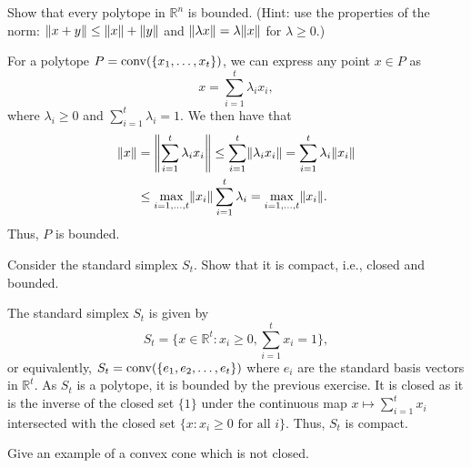 \begin{exercise}
  Show that every polytope in $\mathbb{R}^n$ is bounded.
  (Hint: use the properties of the norm: $\norm{x + y} \leq \norm{x} + \norm{y}$ and $\norm{\lambda x} = \lambda \norm{x}$ for $\lambda \geq 0$.)
\end{exercise}

\begin{solution}
  For a polytope $P = \conv(\{x_1, \ldots, x_t\})$, we can express any point $x \in P$ as
  \begin{equation}
    x = \sum_{i=1}^t \lambda_i x_i,
  \end{equation}
  where $\lambda_i \geq 0$ and $\sum_{i=1}^t \lambda_i = 1$.
  We then have that
  \begin{equation}
    \begin{split}
      \norm{x}
      &= \norm*{\sum_{i=1}^t \lambda_i x_i} \leq \sum_{i=1}^t \norm{\lambda_i x_i} = \sum_{i=1}^t \lambda_i \norm{x_i} \\
      &\leq \max_{i=1, \ldots, t} \norm{x_i} \sum_{i=1}^t \lambda_i = \max_{i=1, \ldots, t} \norm{x_i}.
    \end{split}
  \end{equation}
  Thus, $P$ is bounded.
\end{solution}

\begin{exercise}
  Consider the standard simplex $S_t$.
  Show that it is compact, i.e., closed and bounded.
\end{exercise}

\begin{solution}
  The standard simplex $S_t$ is given by
  \begin{equation}
    S_t = \{ x \in \mathbb{R}^t : x_i \geq 0, \sum_{i=1}^t x_i = 1 \},
  \end{equation}
  or equivalently, $S_t = \conv(\{e_1, e_2, \ldots, e_t\})$ where $e_i$ are the standard basis vectors in $\mathbb{R}^t$.
  As $S_t$ is a polytope, it is bounded by the previous exercise.
  It is closed as it is the inverse of the closed set $\{1\}$ under the continuous map $x \mapsto \sum_{i=1}^t x_i$ intersected with the closed set $\{ x : x_i \geq 0 \text{ for all } i \}$.
  Thus, $S_t$ is compact.
\end{solution}

\begin{exercise}
  Give an example of a convex cone which is not closed.
\end{exercise}

